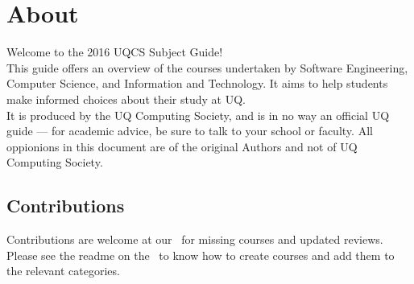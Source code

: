 \section{About}
\hypertarget{core:about}{}
Welcome to the 2016 UQCS Subject Guide!\\

\noindent
This guide offers an overview of the courses undertaken by Software Engineering, Computer Science, and Information and Technology.
It aims to help students make informed choices about their study at UQ.\\

\noindent
It is produced by the UQ Computing Society, and is in no way an official UQ guide --- for academic advice, be sure to talk to your school or faculty.
All oppionions in this document are of the original Authors and not of UQ Computing Society.

\subsection{Contributions}

Contributions are welcome at our \href{https://github.com/UQComputingSociety/subject-guide}{\faGithub}\ for missing courses and updated reviews. Please see the readme
on the \faGithub\ to know how to create courses and add them to the relevant categories.
